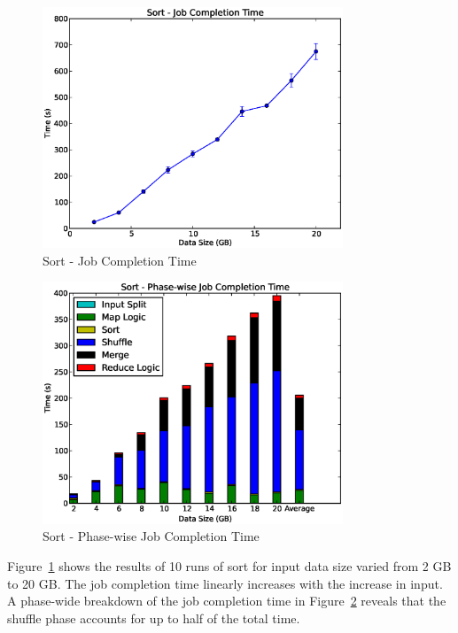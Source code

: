 \documentclass[a4paper,12pt,twoside,openright]{report}
\begin{document}
\begin{figure}[h!]
  \centering
    \includegraphics[width=0.8\textwidth]{sort.eps}
    \caption{Sort - Job Completion Time}
    \label{chap:eval:sec:ciel:fig:sort}
\end{figure}

\begin{figure}[h!]
  \centering
    \includegraphics[width=0.8\textwidth]{sort_phase.eps}
    \caption{Sort - Phase-wise Job Completion Time}
    \label{chap:eval:sec:ciel:fig:sortphase}
\end{figure}

Figure~\ref{chap:eval:sec:ciel:fig:sort} shows the results of 10 runs of sort
for input data size varied from 2 GB to 20 GB. The job completion time linearly
increases with the increase in input. A phase-wide breakdown of the job
completion time in Figure~\ref{chap:eval:sec:ciel:fig:sortphase} reveals that
the shuffle phase accounts for up to half of the total time.
\end{document}
